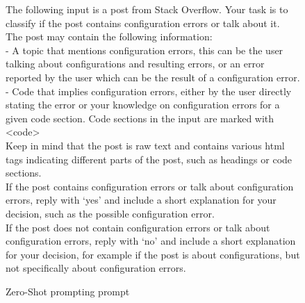 \documentclass[english,bachelor]{swsLeipzig}
\begin{document}
\begin{figure}[h]
  \begin{tcolorbox}[enhanced jigsaw,drop shadow=black!50!white,colback=white]
    The following input is a post from Stack Overflow. Your task is to classify if the post contains configuration errors or talk about it.\\
The post may contain the following information:\\
- A topic that mentions configuration errors, this can be the user talking about configurations and resulting errors, or an error reported by the user which can be the result of a configuration error.\\
- Code that implies configuration errors, either by the user directly stating the error or your knowledge on configuration errors for a given code section. Code sections in the input are marked with <code>\\
Keep in mind that the post is raw text and contains various html tags indicating different parts of the post, such as headings or code sections.\\
If the post contains configuration errors or talk about configuration errors, reply with `yes' and include a short explanation for your decision, such as the possible configuration error.\\
If the post does not contain configuration errors or talk about configuration errors, reply with `no' and include a short explanation for your decision, for example if the post is about configurations, but not specifically about configuration errors.
  \end{tcolorbox}
  \caption{Zero-Shot prompting prompt}
  \label{fig:figure45}
\end{figure}
\end{document}
